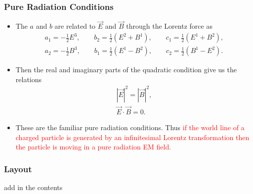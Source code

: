 \documentclass[10pt,a4paper]{beamer}
\begin{document}
\begin{frame} 
\frametitle{Pure Radiation Conditions}
\begin{itemize}
\item<1->{The $a$ and $b$ are related to $\vec{E}$ and $\vec{B}$ through the Lorentz force as
\begin{eqnarray*}
a_1 = -\frac{1}{2} E^3, \qquad b_2 = \frac{1}{2}(E^2 + B^1), \qquad c_1 = \frac{1}{2} (E^1 + B^2),\\
a_2 = -\frac{1}{2} B^3, \qquad b_1 = \frac{1}{2} (E^1 - B^2), \qquad c_2  = \frac{1}{2} (B^1 - E^2). 
\end{eqnarray*}}
\item<2->{Then the real and imaginary parts of the quadratic condition give us the relations
\begin{gather*}
{|\vec{E}|}^2 = {|\vec{B}|}^2, \\
\vec{E} \cdot \vec{B} = 0.
\end{gather*}}
\item<3->{These are the familiar pure radiation conditions. Thus \textcolor{red}{if the world line of a charged particle is generated by an infinitesimal Lorentz transformation then the particle is moving in a pure radiation EM field.}}
\end{itemize}

\end{frame}

\begin{frame}
\frametitle{Layout}
add in the contents

\end{frame}

%
%
\end{document}
